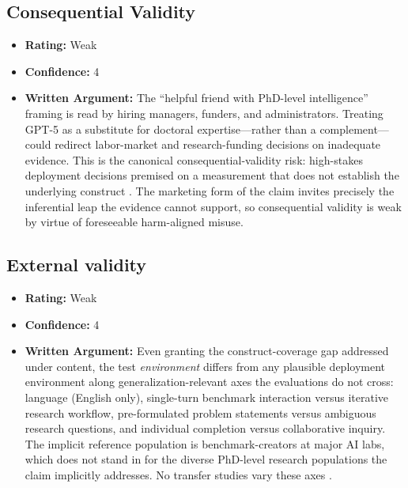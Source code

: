 \subsection{Consequential Validity}
\begin{itemize}
    \item \textbf{Rating:} Weak
    \item \textbf{Confidence:} 4
    \item \textbf{Written Argument:} The ``helpful friend with PhD-level intelligence'' framing is read by hiring managers, funders, and administrators. Treating GPT-5 as a substitute for doctoral expertise---rather than a complement---could redirect labor-market and research-funding decisions on inadequate evidence. This is the canonical consequential-validity risk: high-stakes deployment decisions premised on a measurement that does not establish the underlying construct \citep{salaudeen2025measurement}. The marketing form of the claim invites precisely the inferential leap the evidence cannot support, so consequential validity is weak by virtue of foreseeable harm-aligned misuse.
\end{itemize}

\subsection{External validity}
\begin{itemize}
    \item \textbf{Rating:} Weak
    \item \textbf{Confidence:} 4
    \item \textbf{Written Argument:} Even granting the construct-coverage gap addressed under content, the test \emph{environment} differs from any plausible deployment environment along generalization-relevant axes the evaluations do not cross: language (English only), single-turn benchmark interaction versus iterative research workflow, pre-formulated problem statements versus ambiguous research questions, and individual completion versus collaborative inquiry. The implicit reference population is benchmark-creators at major AI labs, which does not stand in for the diverse PhD-level research populations the claim implicitly addresses. No transfer studies vary these axes \citep{salaudeen2025measurement}.
\end{itemize}

